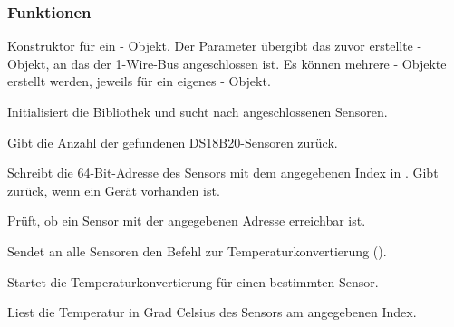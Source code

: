 \subsubsection{Funktionen}
	\begin{description}
		\item {} 
		
		Konstruktor für ein  - Objekt. Der Parameter  übergibt das zuvor erstellte  - Objekt, an das der 1-Wire-Bus angeschlossen ist. Es können mehrere  - Objekte erstellt werden, jeweils für ein eigenes  - Objekt.
		
		\item {} 
		
		Initialisiert die Bibliothek und sucht nach angeschlossenen Sensoren.
		
		\item {} 
		 
		Gibt die Anzahl der gefundenen DS18B20-Sensoren zurück.
		
		\item {} 
		
		Schreibt die 64-Bit-Adresse des Sensors mit dem angegebenen Index in . 
		Gibt  zurück, wenn ein Gerät vorhanden ist.
		
		\item {} 
		
		Prüft, ob ein Sensor mit der angegebenen Adresse erreichbar ist.
		
		\item {} 
		
		Sendet an alle Sensoren den Befehl zur Temperaturkonvertierung ().
		
		\item {} 
		
		Startet die Temperaturkonvertierung für einen bestimmten Sensor.
		
		\item {} 
		
		Liest die Temperatur in Grad Celsius des Sensors am angegebenen Index.
		
		\item {} 
		

\end{description}
